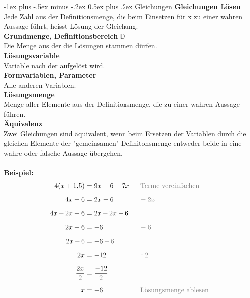 \documentclass[a4paper,10pt]{article}
\makeatletter
\renewcommand{\section}{\@startsection{section}{1}{0mm}%
                                {-1ex plus -.5ex minus -.2ex}%
                                {0.5ex plus .2ex}%
                                {\normalfont\large\bfseries}}
\makeatother
\begin{document}
\begin{multicols}{3}
    \section{Gleichungen}
    \textbf{Gleichungen Lösen} \\
    Jede Zahl aus der Definitionsmenge, die beim Einsetzen für x zu einer wahren Aussage führt, heisst Lösung der Gleichung. \\
    \textbf{Grundmenge, Definitionsbereich} $\mathbb{D}$ \\
    Die Menge aus der die Lösungen stammen dürfen. \\
    \textbf{Lösungsvariable} \\
    Variable nach der aufgelöst wird. \\
    \textbf{Formvariablen, Parameter} \\
    Alle anderen Variablen. \\
    \textbf{Lösungsmenge} \\
    Menge aller Elemente aus der Definitionsmenge, die zu einer wahren Aussage führen. \\
    \textbf{Äquivalenz} \\
    Zwei Gleichungen sind äquivalent, wenn beim Ersetzen der Variablen durch die gleichen Elemente der "gemeinsamen" Definitonsmenge entweder beide in eine wahre oder falsche Aussage übergehen. \\~\\
    \textbf{Beispiel:}
    \begin{align*} 4(x+1{,}5) &= 9x - 6 - 7x &&{\color{gray}| \text{ Terme vereinfachen}} \\[5px] 4x + 6 &= 2x - 6 &&{\color{gray}|\, -2x} \\[5px] 4x {\color{gray}\,-\,2x} + 6 &= 2x {\color{gray}\,-\,2x} - 6 \\[5px] 2x + 6 &= -6 &&{\color{gray}|\, -6} \\[5px] 2x {\color{gray}\,-\,6} &= -6 {\color{gray}\,-\,6} \\[5px] 2x &= -12 &&{\color{gray}|\, :2} \\[5px] \frac{2x}{\color{gray}2} &= \frac{-12}{\color{gray}2} \\[5px] x &= -6 &&{\color{gray}| \text{ Lösungsmenge ablesen}} \end{align*}

\end{multicols}
\end{document}
